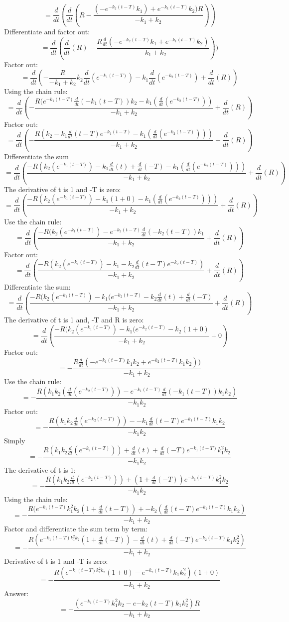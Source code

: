 \documentclass[]{article}
\begin{document}
\[=\frac{d}{dt}(\frac{d}{dt}(R - \frac{(-e^{-k_2(t-T)}k_1) + e^{-k_1(t-T)}k_2)R}{-k_1+k_2}))\]
Differentiate and factor out:
\[=\frac{d}{dt}(\frac{d}{dt}(R) - \frac{R \frac{d}{dt}(-e^{-k_2(t-T)}k_1 + e^{-k_1(t-T)}k_2)}{-k_1+k_2}))\]
Factor out:
\[=\frac{d}{dt}(-\frac{R}{-k_1 + k_2}k_2\frac{d}{dt}(e^{-k_1(t-T)})-k_1\frac{d}{dt}(e^{-k_2(t-T)})+\frac{d}{dt}(R))\]
Using the chain rule:
\[=\frac{d}{dt}(-\frac{R(e^{-k_1(t-T)}\frac{d}{dt}(-k_1(t-T))k_2 - k_1(\frac{d}{dt}(e^{-k_2(t-T)}))}{-k_1 +k_2}+\frac{d}{dt}(R))\]
Factor out:
\[= \frac{d}{dt}(-\frac{R(k_2-k_1 \frac{d}{dt}(t-T)e^{-k_1(t-T)}-k_1( \frac{d}{dt}(e^{-k_2(t-T)})))}{-k_1+k_2} + \frac{d}{dt}(R))\]
Differentiate the sum
\[=\frac{d}{dt}(\frac{-R(k_2(e^{-k_1(t-T)})-k_1\frac{d}{dt}(t)+\frac{d}{dt}(-T)-k_1(\frac{d}{dt}(e^{-k_2(t-T)})))}{-k_1+k_2}+\frac{d}{dt}(R))\]
The derivative of t is 1 and -T is zero:
\[=\frac{d}{dt}(\frac{-R(k_2(e^{-k_1(t-T)})-k_1(1+0)-k_1(\frac{d}{dt}(e^{-k_2(t-T)})))}{-k_1+k_2}+\frac{d}{dt}(R))\]
Use the chain rule:
\[=\frac{d}{dt}(\frac{-R(k_2(e^{-k_1(t-T)})-e^{-k_2(t-T)}\frac{d}{dt}(-k_2(t-T))k_1 }{-k_1+k_2}+\frac{d}{dt}(R))\]
Factor out:
\[=\frac{d}{dt}(\frac{-R(k_2(e^{-k_1(t-T)})-k_1-k_2\frac{d}{dt}(t-T)e^{-k_2(t-T)})  }{-k_1+k_2}+\frac{d}{dt}(R))\]
Differentiate the sum:
\[=\frac{d}{dt}(\frac{-R(k_2(e^{-k_1(t-T)})-k_1(e^{-k_2(t-T)}-k_2\frac{d}{dt}(t)+\frac{d}{dt}(-T)}{-k_1+k_2}+\frac{d}{dt}(R))\]
The derivative of t is 1 and, -T and R is zero:
\[=\frac{d}{dt}(\frac{-R(k_2(e^{-k_1(t-T)})-k_1(e^{-k_2(t-T)}-k_2(1+0)}{-k_1+k_2}+0)\]
Factor out:
\[=-\frac{R\frac{d}{dt}(-e^{-k_1(t-T)}k_1 k_2 + e^{-k_2(t-T)}k_1 k_2))}{-k_1 + k_2}\]
Use the chain rule:
\[=-\frac{R(k_1 k_2(\frac{d}{dt}(e^{-k_2(t-T)}))-e^{-k_1(t-T)}\frac{d}{dt}(-k_1(t-T))k_1 k_2)}{-k_1 k_2}\]
Factor out:
\[=-\frac{R(k_1 k_2 \frac{d}{dt}(e^{-k_2(t-T)}))--k_1\frac{d}{dt}(t-T)e^{-k_1(t-T)}k_1 k_2}{-k_1 k_2}\]
Simply
\[=-\frac{R(k_1 k_2 \frac{d}{dt}(e^{-k_2(t-T)}))+\frac{d}{dt}(t)+\frac{d}{dt}(-T)e^{-k_1(t-T)}k_1^2 k_2}{-k_1 k_2}\]
The derivative of t is 1:
\[=-\frac{R(k_1 k_2 \frac{d}{dt}(e^{-k_2(t-T)}))+(1+\frac{d}{dt}(-T))e^{-k_1(t-T)}k_1^2 k_2}{-k_1 k_2}\]
Using the chain rule:
\[=-\frac{R(e^{-k_1(t-T)}k_1^2k_2(1+\frac{d}{dt}(t-T))+-k_2(\frac{d}{dt}(t-T)e^{-k_2(t-T)}k_1 k_2)}{-k_1 + k_2}\]
Factor and differentiate the sum term by term:
\[=-\frac{R(e^{-k_1(t-T)k_1^2k_2}(1+\frac{d}{dt}(-T))- \frac{d}{dt}(t)+\frac{d}{dt}(-T)e^{-k_2(t-T)}k_1 k_2^2)}{-k_1 + k_2}\]
Derivative of t is 1 and -T is zero:
\[=-\frac{R(e^{-k_1(t-T)k_1^2k_2}(1+0)-e^{-k_2(t-T)}k_1 k_2^2)(1+0)}{-k_1 + k_2}\]
Answer:
\[=-\frac{(e^{-k_1 (t-T)}k_1^2 k_2 -e{-k_2(t-T)}k_1 k_2^2)R}{-k_1 + k_2}\]
\end{document}
